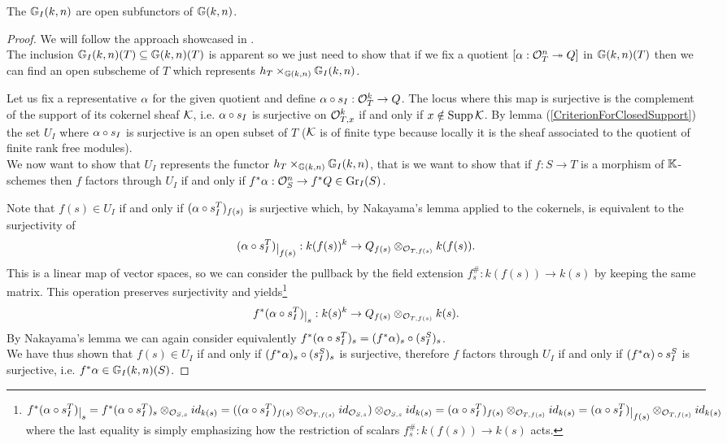 \begin{proposition}\label{GrIAreOpenSubfunctors}
The $\mathbb{G}_I(k,n)$ are open subfunctors of $\mathbb{G}(k,n)$.
\end{proposition}
\begin{proof}
We will follow the approach showcased in \cite{Bejleri2}.\\
The inclusion $\mathbb{G}_I(k,n)(T)\subseteq \mathbb{G}(k,n)(T)$ is apparent so we just need to show that if we fix a quotient $[\alpha:\mathcal{O}_T^n\twoheadrightarrow Q]$ in $\mathbb{G}(k,n)(T)$ then we can find an open subscheme of $T$ which represents $h_T\times_{\mathbb{G}(k,n)}\mathbb{G}_I(k,n)$.\medskip

\noindent Let us fix a representative $\alpha$ for the given quotient and define $\alpha\circ s_I:\mathcal{O}_T^k\to Q$. The locus where this map is surjective is the complement of the support of its cokernel sheaf $\mathcal{K}$, i.e. $\alpha\circ s_I$ is surjective on $\mathcal{O}_{T,x}^k$ if and only if $x\notin \mathrm{Supp}\,\mathcal{K}$. By lemma (\ref{CriterionForClosedSupport}) the set $U_I$ where $\alpha\circ s_I$ is surjective is an open subset of $T$ ($\mathcal{K}$ is of finite type because locally it is the sheaf associated to the quotient of finite rank free modules).\\
We now want to show that $U_I$ represents the functor $h_T\times_{\mathbb{G}(k,n)}\mathbb{G}_I(k,n)$, that is we want to show that if $f:S\to T$ is a morphism of $\mathbb{K}$-schemes then $f$ factors through $U_I$ if and only if $f^\ast\alpha:\mathcal{O}_S^n\to f^\ast Q \in \mathrm{Gr}_I(S)$.\medskip

\noindent Note that $f(s)\in U_I$ if and only if $(\alpha\circ s_I^T)_{f(s)}$ is surjective which, by Nakayama's lemma applied to the cokernels, is equivalent to the surjectivity of
\[(\al\circ s_I^T)\res{f(s)}:k(f(s))^k\to Q_{f(s)}\otimes_{\Oc_{T,f(s)}}k(f(s)).\]
This is a linear map of vector spaces, so we can consider the pullback by the field extension $f^\#_s:k(f(s))\to k(s)$ by keeping the same matrix. This operation preserves surjectivity and yields\footnote{$f^\ast(\al\circ s^T_I)\res s=f^\ast(\al\circ s^T_I)_s\otimes_{\Oc_{S,s}} id_{k(s)}=((\al\circ s^T_I)_{f(s)}\otimes_{\Oc_{T,f(s)}}id_{\Oc_{S,s}})\otimes_{\Oc_{S,s}}id_{k(s)}=(\al\circ s^T_I)_{f(s)}\otimes_{\Oc_{T,f(s)}}id_{k(s)}=(\al\circ s^T_I)\res{f(s)}\otimes_{\Oc_{T,f(s)}} id_{k(s)}$ where the last equality is simply emphasizing how the restriction of scalars $f^\#_s:k(f(s))\to k(s)$ acts.}
\[f^\ast(\al\circ s^T_I)\res s:k(s)^k\to Q_{f(s)}\otimes_{\Oc_{T,f(s)}}k(s).\]
By Nakayama's lemma we can again consider equivalently $f^\ast(\alpha\circ s^T_I)_s=(f^\ast\alpha)_{s}\circ (s^S_I)_s$.\\
We have thus shown that $f(s)\in U_I$ if and only if $(f^\ast\alpha)_{s}\circ (s^S_I)_s$ is surjective, therefore $f$ factors through $U_I$ if and only if $(f^\ast\alpha)\circ s^S_I$ is surjective, i.e. $f^\ast\alpha\in \mathbb{G}_I(k,n)(S)$.
\end{proof}


